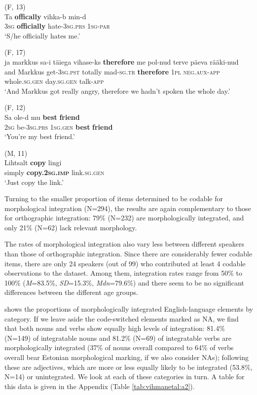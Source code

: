 \documentclass[output=paper]{langscibook}
\begin{document}
\ea%
    \label{ex:vihmanetal:3}
\ea  (F, 13)\\ \label{ex:vihmanetal:3a}
\gll Ta  \textbf{{offically}}  vihka-b     min-d\\
3\textsc{sg}  \textbf{officially}  hate{}-3\textsc{sg.prs}  \textsc{1sg-par}\\
\glt ‘S/he officially hates me.’

\ex  (F, 17)\\ \label{ex:vihmanetal:3b}
\gll ja   markkus  sa-i     täiega  vihase-ks   \textbf{therefore}   me   pol-nud   terve     päeva     rääki-nud\\
and   Markkus get{}-\textsc{3sg.pst}   totally   mad{}-\textsc{sg.tr}   \textbf{therefore}   \textsc{1pl}  \textsc{neg.aux-app}   whole.\textsc{sg.gen}  day.\textsc{sg.gen}   talk{}-\textsc{app}\\
\glt ‘And Markkus got really angry, therefore we hadn’t spoken the whole day.’

\ex  (F, 12)\\ \label{ex:vihmanetal:3c}
\gll Sa   ole-d     mu     \textbf{best} \textbf{friend}\\
2\textsc{sg}  be{}-3\textsc{sg.prs}   \textsc{1sg.gen}   \textbf{best} \textbf{friend}\\
\glt ‘You’re my best friend.’

\ex   (M, 11)\\ \label{ex:vihmanetal:3d}
\gll Lihtsalt     \textbf{{copy}}     lingi\\
simply     \textbf{copy.\textsc{2sg.imp} }  link.\textsc{sg.gen}\\
\glt ‘Just copy the link.’
    \z
\z


Turning to the smaller proportion of items determined to be codable for morphological integration (N=294), the results are again complementary to those for orthographic integration: 79\% (N=232) are morphologically integrated, and only 21\% (N=62) lack relevant morphology.

The rates of morphological integration also vary less between different speakers than those of orthographic integration. Since there are considerably fewer codable items, there are only 24 speakers (out of 99) who contributed at least 4 codable observations to the dataset. Among them, integration rates range from 50\% to 100\% (\textit{M}=83.5\%, \textit{SD}=15.3\%, \textit{Mdn}=79.6\%) and there seem to be no significant differences between the different age groups.

 shows the proportions of morphologically integrated English-lan\-guage elements by category. If we leave aside the code-switched elements marked as NA, we find that both nouns and verbs show equally high levels of integration: 81.4\% (N=149) of integratable nouns and 81.2\% (N=69) of integratable verbs are morphologically integrated (37\% of nouns overall compared to 64\% of verbs overall bear Estonian morphological marking, if we also consider NAs); following these are adjectives, which are more or less equally likely to be integrated (53.8\%, N=14) or unintegrated. We look at each of these categories in turn. A table for this data is given in the Appendix (Table \ref{tab:vihmanetal:a2}).
\end{document}
